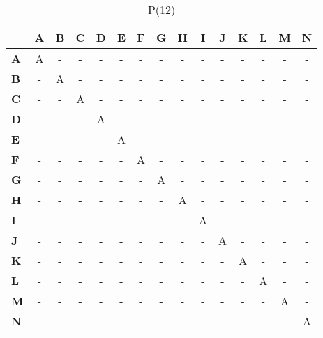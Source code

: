 \documentclass{article}
\begin{document}
\begin{table}[H]\centering
\caption{P(12)}
\begin{tabular}{l c c c c c c c c c c c c c c}
\toprule
 & \textbf{A} & \textbf{B} & \textbf{C} & \textbf{D} & \textbf{E} & \textbf{F} & \textbf{G} & \textbf{H} & \textbf{I} & \textbf{J} & \textbf{K} & \textbf{L} & \textbf{M} & \textbf{N}\\\midrule
\textbf{A} & A & - & - & - & - & - & - & - & - & - & - & - & - & - \\
\textbf{B} & - & A & - & - & - & - & - & - & - & - & - & - & - & - \\
\textbf{C} & - & - & A & - & - & - & - & - & - & - & - & - & - & - \\
\textbf{D} & - & - & - & A & - & - & - & - & - & - & - & - & - & - \\
\textbf{E} & - & - & - & - & A & - & - & - & - & - & - & - & - & - \\
\textbf{F} & - & - & - & - & - & A & - & - & - & - & - & - & - & - \\
\textbf{G} & - & - & - & - & - & - & A & - & - & - & - & - & - & - \\
\textbf{H} & - & - & - & - & - & - & - & A & - & - & - & - & - & - \\
\textbf{I} & - & - & - & - & - & - & - & - & A & - & - & - & - & - \\
\textbf{J} & - & - & - & - & - & - & - & - & - & A & - & - & - & - \\
\textbf{K} & - & - & - & - & - & - & - & - & - & - & A & - & - & - \\
\textbf{L} & - & - & - & - & - & - & - & - & - & - & - & A & - & - \\
\textbf{M} & - & - & - & - & - & - & - & - & - & - & - & - & A & - \\
\textbf{N} & - & - & - & - & - & - & - & - & - & - & - & - & - & A \\
\bottomrule
\end{tabular}
\end{table}
\end{document}
